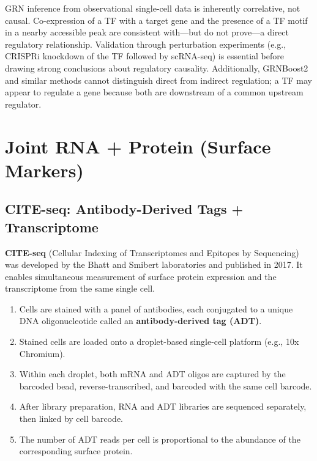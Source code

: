 \begin{warningbox}
GRN inference from observational single-cell data is inherently correlative, not causal. Co-expression of a TF with a target gene and the presence of a TF motif in a nearby accessible peak are consistent with---but do not prove---a direct regulatory relationship. Validation through perturbation experiments (e.g., CRISPRi knockdown of the TF followed by scRNA-seq) is essential before drawing strong conclusions about regulatory causality. Additionally, GRNBoost2 and similar methods cannot distinguish direct from indirect regulation; a TF may appear to regulate a gene because both are downstream of a common upstream regulator.
\end{warningbox}


\section{Joint RNA + Protein (Surface Markers)}
\label{sec:multiomics:rna-protein}

\subsection{CITE-seq: Antibody-Derived Tags + Transcriptome}
\label{subsec:multiomics:cite-seq}

\textbf{CITE-seq} (Cellular Indexing of Transcriptomes and Epitopes by Sequencing) was developed by the Bhatt and Smibert laboratories and published in 2017. It enables simultaneous measurement of surface protein expression and the transcriptome from the same single cell.

\begin{protocolbox}[title={CITE-seq Principle}]
\begin{enumerate}[itemsep=2pt]
  \item Cells are stained with a panel of antibodies, each conjugated to a unique DNA oligonucleotide called an \textbf{antibody-derived tag (ADT)}.
  \item Stained cells are loaded onto a droplet-based single-cell platform (e.g., 10x Chromium).
  \item Within each droplet, both mRNA and ADT oligos are captured by the barcoded bead, reverse-transcribed, and barcoded with the same cell barcode.
  \item After library preparation, RNA and ADT libraries are sequenced separately, then linked by cell barcode.
  \item The number of ADT reads per cell is proportional to the abundance of the corresponding surface protein.
\end{enumerate}
\end{protocolbox}

